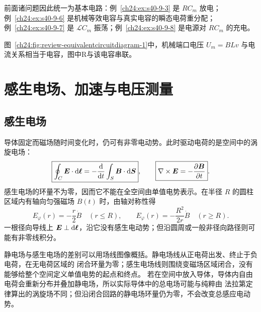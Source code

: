 {\begin{xesolution}
前面诸问题因此统一为基本电路：例~\ref{ch24:ex:s40-9-3} 是 $RC_m$ 放电；例~\ref{ch24:ex:s40-9-6} 是机械等效电容与真实电容的瞬态电荷重分配；
例~\ref{ch24:ex:s40-9-7} 是 $\mathcal LC_m$ 振荡；例~\ref{ch24:ex:s40-9-8} 是电源对 $RC_m$ 的充电。

图~\ref{ch24:fig:review-equivalentcircuitdiagram-1}中，机械端口电压 $U_m=BLv$ 与电流关系相当于电容，图中R与该电容串联。
\par\noindent\begin{minipage}{\linewidth}
\equivalentCircuitDiagram
{}
\end{minipage}\par\medskip
\end{xesolution}



\section{感生电场、加速与电压测量}

\subsection{感生电场}


导体固定而磁场随时间变化时，仍可有非零电动势。此时驱动电荷的是空间中的涡旋电场：
\begin{equation}
  \boxed{\oint_C\bm{E}\cdot\mathop{}\!\mathrm d\bm{\ell}
  =-\frac{\mathop{}\!\mathrm d}{\mathop{}\!\mathrm d t}\int_S\bm{B}\cdot\mathop{}\!\mathrm d\bm{S}},
  \qquad
  \boxed{\nabla\times\bm{E}=-\frac{\partial\bm{B}}{\partial t}}.
\end{equation}
感生电场的环量不为零，因而它不能在全空间由单值电势表示。在半径 $R$ 的圆柱区域内有轴向匀强磁场
$B(t)$ 时，由轴对称性得
\begin{equation}
  \boxed{E_\varphi(r)=-\frac r2\dot B\quad(r\le R)},
  \qquad
  \boxed{E_\varphi(r)=-\frac{R^2}{2r}\dot B\quad(r\ge R)}.
\end{equation}
一根径向导线上 $\bm{E}\perp\mathop{}\!\mathrm d\bm{\ell}$，沿它没有感生电动势；但沿圆周或一般非径向路径则可能有非零线积分。

静电场与感生电场的差别可以用场线图像概括。静电场线从正电荷出发、终止于负电荷，在无电荷区域的
闭合环量为零；感生电场线则围绕变磁场区域闭合，没有能够给整个空间定义单值电势的起点和终点。
若在空间中放入导体，导体内自由电荷会重新分布并叠加静电场，所以实际导体中的总电场可能与纯粹由
法拉第定律算出的涡旋场不同；但沿闭合回路的静电场环量仍为零，不会改变总感应电动势。

}
